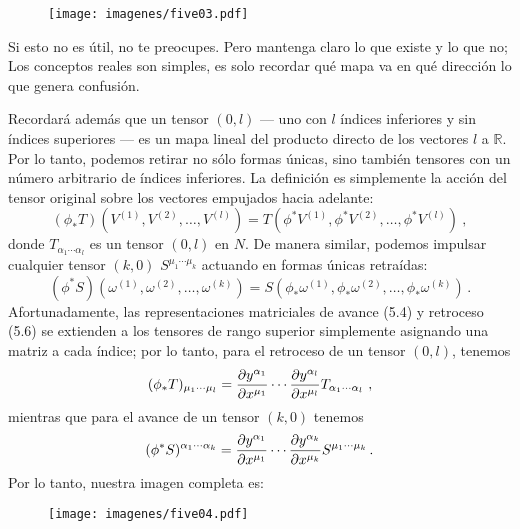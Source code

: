 \documentclass[11pt,b5paper,openany,twoside]{book}
\newcommand{\R}{\mathbb{R}}
\begin{document}
\begin{figure}[h]
\centering
\texttt{[image: imagenes/five03.pdf]}
\end{figure}

\noindent
Si esto no es útil, no te preocupes.
Pero mantenga claro lo que existe y lo que no; Los conceptos reales son simples, es solo recordar qué mapa va en qué dirección lo que genera confusión.

Recordará además que un tensor $(0,l)$ --- uno con $l$ índices inferiores y sin índices superiores --- es un mapa lineal del producto directo de los vectores $l$ a $\R$.
Por lo tanto, podemos retirar no sólo formas únicas, sino también tensores con un número arbitrario de índices inferiores.
La definición es simplemente la acción del tensor original sobre los vectores empujados hacia adelante:
\begin{equation}
(\phi_* T)(V^{(1)}, V^{(2)},\ldots ,V^{(l)})=T(\phi^*V^{(1)},
\phi^*V^{(2)},\ldots ,\phi^*V^{(l)})\ ,\label{5.7}
\end{equation}
donde $T_{\alpha_1 \cdots \alpha_l}$ es un tensor $(0,l)$ en $N$.
De manera similar, podemos impulsar cualquier tensor $(k,0)$ $S^{\mu_1 \cdots \mu_k}$ actuando en formas únicas retraídas:
\begin{equation}
(\phi^* S)(\omega^{(1)}, \omega^{(2)},\ldots ,\omega^{(k)})=
S(\phi_*\omega^{(1)}, \phi_*\omega^{(2)},\ldots ,\phi_*\omega^{(k)})
\,.\label{5.8}
\end{equation}
Afortunadamente, las representaciones matriciales de avance (5.4) y retroceso (5.6) se extienden a los tensores de rango superior simplemente asignando una matriz a cada índice; por lo tanto, para el retroceso de un tensor $(0,l)$, tenemos
\begin{equation}
(\phi_* T)_{\mu_1 \cdots \mu_l} = {{\partial y^{\alpha_1}}
\over{\partial x^{\mu_1}}}\cdots{{\partial y^{\alpha_l}}
\over{\partial x^{\mu_l}}}T_{\alpha_1 \cdots \alpha_l}\ ,\label{5.9}
\end{equation}
mientras que para el avance de un tensor $(k,0)$ tenemos
\begin{equation}
(\phi^* S)^{\alpha_1 \cdots \alpha_k} = {{\partial y^{\alpha_1}}
\over{\partial x^{\mu_1}}}\cdots{{\partial y^{\alpha_k}}
\over{\partial x^{\mu_k}}}S^{\mu_1 \cdots \mu_k}\,.\label{5.10}
\end{equation}
Por lo tanto, nuestra imagen completa es:

\begin{figure}[h]
\centering
\texttt{[image: imagenes/five04.pdf]}
\end{figure}
\end{document}
